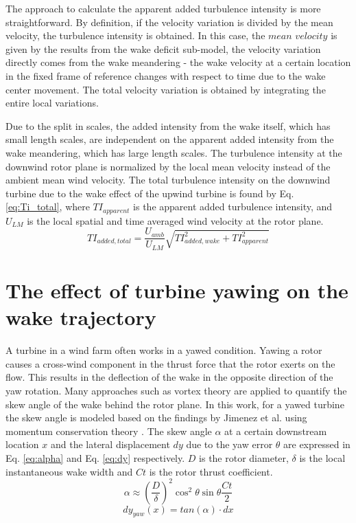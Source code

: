 \documentclass{umthesis}
\begin{document}
The approach to calculate the apparent added turbulence intensity is more straightforward. By definition, if the velocity variation is divided by the mean velocity, the turbulence intensity is obtained. In this case, the $mean$ $velocity$ is given by the results from the wake deficit sub-model, the velocity variation directly comes from the wake meandering - the wake velocity at a certain location in the fixed frame of reference changes with respect to time due to the wake center movement. The total velocity variation is obtained by integrating the entire local variations.

Due to the split in scales, the added intensity from the wake itself, which has small length scales, are independent on the apparent added intensity from the wake meandering, which has large length scales. The turbulence intensity at the downwind rotor plane is normalized by the local mean velocity instead of the ambient mean wind velocity. The total turbulence intensity on the downwind turbine due to the wake effect of the upwind turbine is found by Eq. \ref{eq:Ti_total}, where $TI_{apparent}$ is the apparent added turbulence intensity, and $U_{LM}$ is the local spatial and time averaged wind velocity at the rotor plane.
\begin{equation}\label{eq:Ti_total}
  TI_{added,total}=\frac{U_{amb}}{U_{LM}}\sqrt{TI_{added,wake}^2+TI_{apparent}^2}
\end{equation}

\section{The effect of turbine yawing on the wake trajectory}\label{sec:turbine_yaw}
A turbine in a wind farm often works in a yawed condition. Yawing a rotor causes a cross-wind component in the thrust force that the rotor exerts on the flow. This results in the deflection of the wake in the opposite direction of the yaw rotation. Many approaches such as vortex theory are applied to quantify the skew angle of the wake behind the rotor plane. In this work, for a yawed turbine the skew angle is modeled based on the findings by Jimenez et al. using momentum conservation theory \cite{Jiménez}. The skew angle $\alpha$ at a certain downstream location $x$ and the lateral displacement $dy$ due to the yaw error $\theta$ are expressed in Eq. \ref{eq:alpha} and Eq. \ref{eq:dy} respectively. $D$ is the rotor diameter, $\delta$ is the local instantaneous wake width and $Ct$ is the rotor thrust coefficient.
\begin{equation}\label{eq:alpha}
  \alpha\approx(\frac{D}{\delta})^2\cos ^2\theta\sin\theta\frac{Ct}{2}
\end{equation}
\begin{equation}\label{eq:dy}
  dy_{yaw}(x)=tan(\alpha)\cdot dx
\end{equation}
\end{document}
